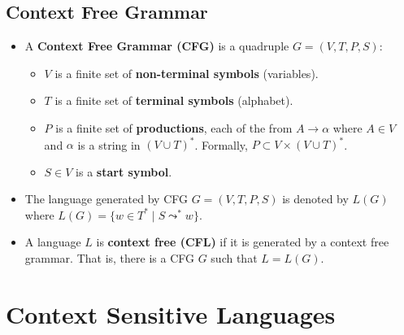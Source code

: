 \documentclass[12pt]{article}
\begin{document}
\subsection{Context Free Grammar}
\begin{itemize}
    \item A \textbf{Context Free Grammar (CFG)} is a quadruple $G = (V, T, P, S)$:
    \begin{itemize}
        \item $V$ is a finite set of \textbf{non-terminal symbols} (variables).
        \item $T$ is a finite set of \textbf{terminal symbols} (alphabet).
        \item $P$ is a finite set of \textbf{productions}, each of the from $A \rightarrow \alpha$ where $A \in V$ and $\alpha$ is a string in $(V \cup T)^{\ast}$. Formally, $P \subset V \times (V \cup T)^{\ast}$.
        \item $S \in V$ is a \textbf{start symbol}.
    \end{itemize}
    \item The language generated by CFG $G = (V, T, P, S)$ is denoted by $L(G)$ where $L(G) = \{ w \in T^{\ast} \mid S \leadsto^{\ast} w \}$.
    \item A language $L$ is \textbf{context free (CFL)} if it is generated by a context free grammar. That is, there is a CFG $G$ such that $L = L(G)$.
\end{itemize}

\section{Context Sensitive Languages}
\end{document}
